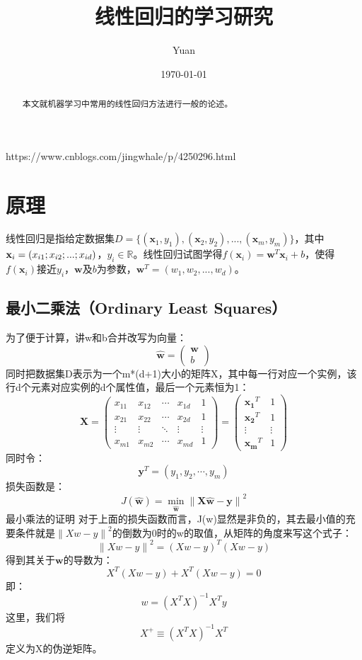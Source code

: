 \documentclass[12pt,a4paper,draft]{ctexart}
\title{线性回归的学习研究}
\author{Yuan}
\date{\today}
\begin{document}
\maketitle
\begin{abstract}
本文就机器学习中常用的线性回归方法进行一般的论述。
\end{abstract}	
https://www.cnblogs.com/jingwhale/p/4250296.html
\section{原理}
线性回归是指给定数据集$ D=\{(\mathbf{x}_{1},y_{1}),(\mathbf{x}_{2},y_{2}),...,(\mathbf{x}_{m},y_{m})\} $，其中$\mathbf{x}_i=(x_{i1};x_{i2};\\...;x_{id})$，$y_{i}\in\mathbb{R} $。线性回归试图学得$f(\mathbf{x}_{i})=\mathbf{w}^T\mathbf{x}_{i}+b$，使得$f(\mathbf{x}_{i})$接近$ y_{i}$，$\mathbf{w}$及$b$为参数，$\mathbf{w}^T=(w_1,w_2,...,w_d)$。
\subsection{最小二乘法（Ordinary Least Squares）}
为了便于计算，讲w和b合并改写为向量：
\[ \hat{\mathbf{w}}=\begin{pmatrix}
\mathbf{w} \\ 
b
\end{pmatrix}  \]
同时把数据集D表示为一个m*(d+1)大小的矩阵X，其中每一行对应一个实例，该行d个元素对应实例的d个属性值，最后一个元素恒为1：
\[ 
\mathbf{X}=
\begin{pmatrix}
	x_{11} & x_{12} & \cdots & x_{1d} & 1 \\ 
	x_{21} & x_{22} & \cdots & x_{2d} & 1 \\ 
	\vdots & \vdots & \ddots & \vdots & \vdots \\ 
	x_{m1} & x_{m2} & \cdots & x_{md} & 1
\end{pmatrix} =\begin{pmatrix}
\mathbf{x_1}^T & 1 \\ 
\mathbf{x_2}^T & 1 \\ 
\vdots & \vdots \\ 
\mathbf{x_m}^T & 1
\end{pmatrix} 
\]
同时令：
\[ \mathbf{y}^T=(y_1,y_2,\cdots,y_m) \]
损失函数是： 
\[ J(\mathbf{\hat{w}})=\min_{\mathbf{\hat{w}}}\left \| \mathbf{X}\mathbf{\hat{w}}-\mathbf{y} \right \|^{2} \]
最小乘法的证明
对于上面的损失函数而言，J(w)显然是非负的，其去最小值的充要条件就是$ \left \| Xw-y \right \|^{2} $的倒数为0时的w的取值，从矩阵的角度来写这个式子： 
\[ \left \| Xw-y \right \|^{2}=(Xw-y)^T(Xw-y) \]
得到其关于$ \mathbf{w} $的导数为： 
\[ X^T(Xw-y) + X^T(Xw-y)=0 \]
即： 
\[ w=(X^TX)^{-1}X^Ty \]
这里，我们将\[ X^+\equiv(X^TX)^{-1}X^T \]定义为X的伪逆矩阵。
\end{document}
